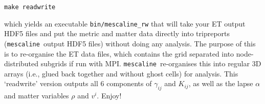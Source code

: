 \documentclass[a4paper]{article}
\newcommand{\mesc}{\texttt{mescaline}}
\begin{document}
\noindent \texttt{make readwrite}

which yields an executable \texttt{bin/mescaline\_rw} that will take your ET output HDF5 files and put the metric and matter data directly into tripreports (\mesc\, output HDF5 files) without doing any analysis. The purpose of this is to re-organise the ET data files, which contains the grid separated into node-distributed subgrids if run with MPI. \mesc\, re-organises this into regular 3D arrays (i.e., glued back together and without ghost cells) for analysis. This `readwrite' version outputs all 6 components of $\gamma_{ij}$ and $K_{ij}$, as well as the lapse $\alpha$ and matter variables $\rho$ and $v^i$. Enjoy! 





\end{document}
